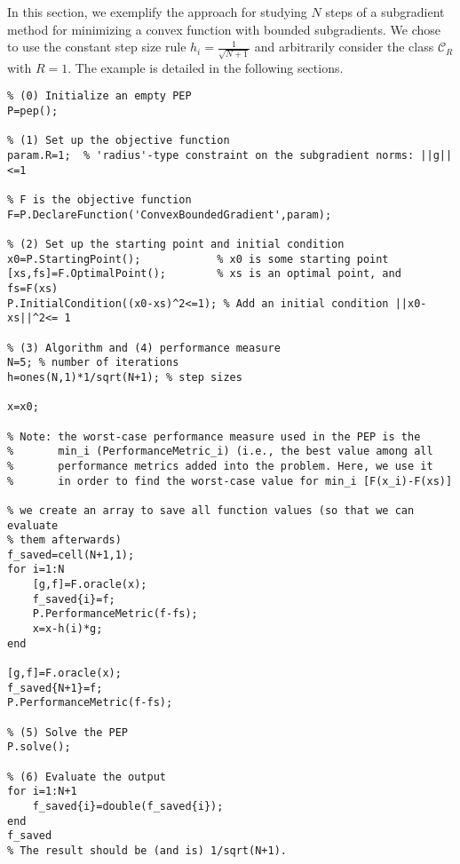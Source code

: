 \documentclass[11pt,a4paper]{article}
\begin{document}
	In this section, we exemplify the approach for studying $N$ steps of a subgradient method for minimizing a convex function with bounded subgradients. We chose to use the constant step size rule $h_i=\frac{1}{\sqrt{N+1}}$ and arbitrarily consider the class $\mathcal{C}_R$ with $R=1$. The example is detailed in the following sections.
\begin{lstlisting}
% (0) Initialize an empty PEP
P=pep();

% (1) Set up the objective function
param.R=1;	% 'radius'-type constraint on the subgradient norms: ||g||<=1

% F is the objective function
F=P.DeclareFunction('ConvexBoundedGradient',param);

% (2) Set up the starting point and initial condition
x0=P.StartingPoint();            % x0 is some starting point
[xs,fs]=F.OptimalPoint();        % xs is an optimal point, and fs=F(xs)
P.InitialCondition((x0-xs)^2<=1); % Add an initial condition ||x0-xs||^2<= 1

% (3) Algorithm and (4) performance measure
N=5; % number of iterations
h=ones(N,1)*1/sqrt(N+1); % step sizes

x=x0;

% Note: the worst-case performance measure used in the PEP is the
%       min_i (PerformanceMetric_i) (i.e., the best value among all
%       performance metrics added into the problem. Here, we use it
%       in order to find the worst-case value for min_i [F(x_i)-F(xs)]

% we create an array to save all function values (so that we can evaluate
% them afterwards)
f_saved=cell(N+1,1);
for i=1:N
	[g,f]=F.oracle(x);
	f_saved{i}=f;
	P.PerformanceMetric(f-fs);
	x=x-h(i)*g;
end

[g,f]=F.oracle(x);
f_saved{N+1}=f;
P.PerformanceMetric(f-fs);

% (5) Solve the PEP
P.solve();

% (6) Evaluate the output
for i=1:N+1
	f_saved{i}=double(f_saved{i});
end
f_saved
% The result should be (and is) 1/sqrt(N+1).
	\end{lstlisting}
	\newpage
\end{document}
